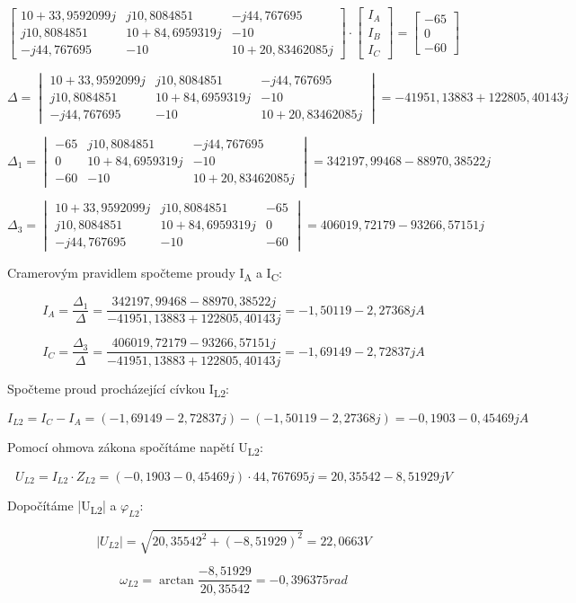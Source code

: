 \[ \begin{bmatrix}
10+33,9592099j & j10,8084851 & -j44,767695\\
j10,8084851 & 10 + 84,6959319j & -10\\
-j44,767695 & -10 & 10 + 20,83462085j
\end{bmatrix} \cdot \begin{bmatrix}
I_{A} \\ I_{B} \\ I_{C}
\end{bmatrix} = \begin{bmatrix}
-65 \\ 0 \\ -60
\end{bmatrix} \]

\[ \Delta =
\begin{vmatrix}
10+33,9592099j & j10,8084851 & -j44,767695\\
j10,8084851 & 10 + 84,6959319j & -10\\
-j44,767695 & -10 & 10 + 20,83462085j
\end{vmatrix} = -41951,13883 + 122805,40143j
\]

\[ \Delta_{1} =
\begin{vmatrix}
-65 & j10,8084851 & -j44,767695\\
0 & 10 + 84,6959319j & -10\\
-60 & -10 & 10 + 20,83462085j
\end{vmatrix} = 342197,99468-88970,38522j
\]

\[ \Delta_{3} =
\begin{vmatrix}
10+33,9592099j & j10,8084851 & -65\\
j10,8084851 & 10 + 84,6959319j & 0\\
-j44,767695 & -10 & -60
\end{vmatrix} =  406019,72179-93266,57151j
\]

Cramerovým pravidlem spočteme proudy I\textsubscript{A} a I\textsubscript{C}:

\[ I_{A} = \frac{\Delta_{1}}{\Delta} = \frac{342197,99468-88970,38522j}{-41951,13883 + 122805,40143j} = -1,50119-2,27368jA \]

\[ I_{C} = \frac{\Delta_{3}}{\Delta} = \frac{406019,72179-93266,57151j}{-41951,13883 + 122805,40143j} = -1,69149-2,72837jA \]

Spočteme proud procházející cívkou I\textsubscript{L2}:

\[ I_{L2} = I_{C} - I_{A} = (-1,69149-2,72837j) - (-1,50119-2,27368j) = -0,1903-0,45469jA \]

Pomocí ohmova zákona spočítáme napětí U\textsubscript{L2}:

\[ U_{L2} = I_{L2} \cdot Z_{L2} = (-0,1903-0,45469j) \cdot 44,767695j = 20,35542-8,51929jV  \]

Dopočítáme |U\textsubscript{L2}| a \(\varphi_{L2}\):

\[ \lvert U_{L2} \rvert = \sqrt{20,35542^{2} + (-8,51929)^{2}} = 22,0663V\]

\[ \omega_{L2} = \arctan{\frac{-8,51929}{20,35542}} = -0,396375 rad\]